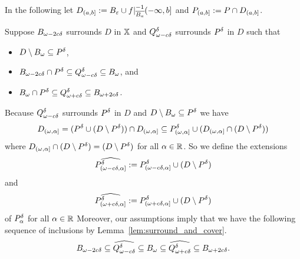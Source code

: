 In the following let $D\subi{a,b} := B_\e\cup f\rest_{\comp{B_a}}^{-1}(-\infty,b]$ and $P\subi{a,b} := P\cap D\subi{a,b}$.

Suppose $\b$ surrounds $D$ in $\X$ and $\Q^\of$ surrounds $\P$ in $D$ such that
\begin{itemize}
  \item $D\setminus \B\subseteq \P$,
  \item $\b\cap \P \subseteq \Q^\of\subseteq \B$, and
  \item $\B\cap \P\subseteq \QQ^\of\subseteq \BB$.
\end{itemize}

Because $\Q^\delta$ surrounds $\P$ in $D$ and $D\setminus \B\subseteq \P$ we have
\[ D\subi{\omega,\alpha} = (\P\cup (D\setminus \P))\cap D\subi{\omega,\alpha}\subseteq \P\subi{\omega,\alpha} \cup (D\subi{\omega,\alpha}\cap (D\setminus \P))\]
where $D\subi{\omega,\alpha}\cap (D\setminus \P) = (D\setminus \P)$ for all $\alpha\in\R$.
So we define the extensions
\[\ext{\P\subi{\omega-c\delta, \alpha}} := \P\subi{\omega-c\delta, \alpha}\cup (D\setminus \P)\]
and
\[\ext{\P\subi{\omega+c\delta, \alpha}} := \P\subi{\omega+c\delta, \alpha}\cup (D\setminus \P)\]
of $\P_\alpha$ for all $\alpha\in\R$
Moreover, our assumptions imply that we have the following sequence of inclusions by Lemma~\ref{lem:surround_and_cover}.
\[ \b\subseteq \ext{\Q^\of}\subseteq \B\subseteq\ext{\QQ^\of}\subseteq \BB.\]

